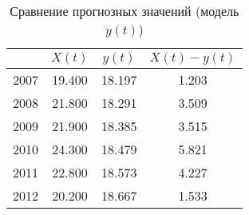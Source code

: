 \begin{table}[ht]
\centering
\caption{Сравнение прогнозных значений (модель $ y(t) $)} 
\label{table:prediction_trend}
\begin{tabular}{r|ccc}
  \hline
 & $X(t)$ & $y(t)$ & $ X(t) - y(t) $ \\ 
  \hline
2007 & 19.400 & 18.197 & 1.203 \\ 
  2008 & 21.800 & 18.291 & 3.509 \\ 
  2009 & 21.900 & 18.385 & 3.515 \\ 
  2010 & 24.300 & 18.479 & 5.821 \\ 
  2011 & 22.800 & 18.573 & 4.227 \\ 
  2012 & 20.200 & 18.667 & 1.533 \\ 
   \hline
\end{tabular}
\end{table}
